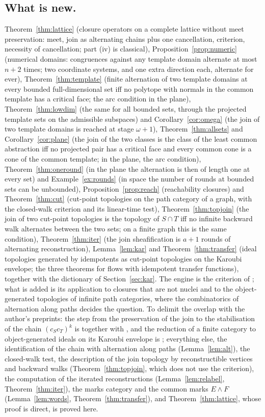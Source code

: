 \documentclass[11pt]{amsart}
\theoremstyle{definition}
\begin{document}
\subsection*{What is new.}
Theorem~\ref{thm:lattice} (closure operators on a complete lattice without
meet preservation: meet, join as alternating chains plus one cancellation,
criterion, necessity of cancellation; part (iv) is classical),
Proposition~\ref{prop:numeric} (numerical domains: congruences against
any template domain alternate at most $n+2$ times; two coordinate
systems, and one extra direction each, alternate for ever),
Theorem~\ref{thm:template} (finite alternation of two template domains
at every bounded full-dimensional set iff no polytope with normals in
the common template has a critical face; the arc condition in the
plane), Theorem~\ref{thm:lowdim} (the same for all bounded sets, through
the projected template sets on the admissible subspaces) and
Corollary~\ref{cor:omega} (the join of two template domains is reached
at stage $\omega+1$), Theorem~\ref{thm:allsets} and
Corollary~\ref{cor:plane} (the join of the two classes is the class of
the least common abstraction iff no projected pair has a critical face
and every common cone is a cone of the common template; in the plane,
the arc condition), Theorem~\ref{thm:oneround} (in the plane the
alternation is then of length one at every set) and
Example~\ref{ex:rounds} (in space the number of rounds at bounded sets
can be unbounded),
Proposition~\ref{prop:reach} (reachability closures) and
Theorem~\ref{thm:cut} (cut-point topologies on the path category of a
graph, with the closed-walk criterion and its linear-time test),
Theorem~\ref{thm:topjoin} (the join of two cut-point topologies is the
topology of $S\cap T$ iff no infinite backward walk alternates between
the two sets; on a finite graph this is the same condition),
Theorem~\ref{thm:iter} (the join sheafification is $a+1$ rounds of
alternating reconstruction), Lemma~\ref{lem:kar} and
Theorem~\ref{thm:transfer} (ideal topologies generated by idempotents as
cut-point topologies on the Karoubi envelope; the three theorems for
flows with idempotent transfer functions), together with the dictionary of Section~\ref{sec:kar}. The
engine is the criterion of \cite{Fijoin}; what is added is its application
to closures that are not nuclei and to the object-generated topologies of
infinite path categories, where the combinatorics of alternation along
paths decides the question. To delimit the overlap with the author's
preprints: the step from the preservation of the join to the
stabilisation of the chain $(c_Sc_T)^k$ is \cite[Thm.~B]{Fijoin}
together with \cite[Cor.~1.3]{Stabjoin}, and the reduction of a finite
category to object-generated ideals on its Karoubi envelope is
\cite[\S2]{Finitejoin}; everything else, the identification of the
chain with alternation along paths (Lemma~\ref{lem:alt}), the closed-walk
test, the description of the join topology by reconstructible vertices
and backward walks (Theorem~\ref{thm:topjoin}, which does not use the
criterion), the computation of the iterated reconstructions
(Lemma~\ref{lem:relabel}, Theorem~\ref{thm:iter}), the marks category
and the common marks $E\wedge F$ (Lemma~\ref{lem:words},
Theorem~\ref{thm:transfer}), and Theorem~\ref{thm:lattice}, whose proof
is direct, is proved here.
\end{document}
